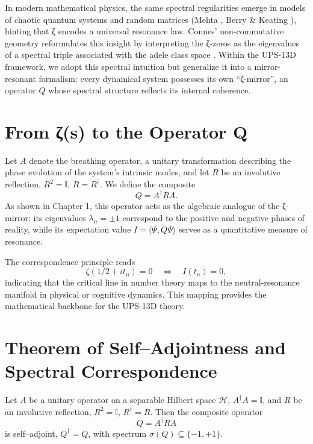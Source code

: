In modern mathematical physics, the same spectral regularities
emerge in models of chaotic quantum systems
and random matrices (Mehta \cite{Mehta2004},
Berry \& Keating \cite{BerryKeating2008}),
hinting that ζ encodes a universal resonance law.
Connes’ non-commutative geometry reformulates this insight
by interpreting the ζ-zeros as the eigenvalues of a spectral triple
associated with the adele class space \cite{Connes1999}.
Within the UPS-13D framework,
we adopt this spectral intuition
but generalize it into a mirror-resonant formalism:
every dynamical system possesses its own “ζ-mirror”,
an operator $Q$ whose spectral structure
reflects its internal coherence.

\section{From ζ(s) to the Operator Q}

Let $A$ denote the breathing operator,
a unitary transformation describing the phase evolution
of the system’s intrinsic modes,
and let $R$ be an involutive reflection,
$R^2 = \mathbb{I}$, $R = R^{\dagger}$.
We define the composite
\[
Q = A^{\dagger} R A .
\]
As shown in Chapter 1,
this operator acts as the algebraic analogue
of the ζ-mirror:
its eigenvalues $\lambda_n = \pm 1$
correspond to the positive and negative phases of reality,
while its expectation value
$I = \langle \Psi, Q \Psi \rangle$
serves as a quantitative measure of resonance.

The correspondence principle reads
\[
\zeta(1/2 + i t_n) = 0
\quad \Longleftrightarrow \quad
I(t_n) = 0,
\]
indicating that the critical line in number theory
maps to the neutral-resonance manifold
in physical or cognitive dynamics.
This mapping provides the mathematical backbone
for the UPS-13D theory.


\section{Theorem of Self–Adjointness and Spectral Correspondence}

\begin{theorem}
Let $A$ be a unitary operator on a separable Hilbert space $\mathcal{H}$,
$A^{\dagger}A = \mathbb{I}$,
and $R$ be an involutive reflection,
$R^2 = \mathbb{I}$, $R^{\dagger} = R$.
Then the composite operator
\[
Q = A^{\dagger} R A
\]
is self–adjoint, $Q^{\dagger} = Q$,
with spectrum $\sigma(Q) \subseteq \{-1,+1\}$.
\end{theorem}

